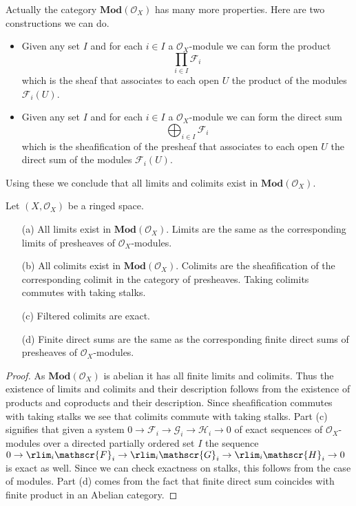 Actually the category $\mathbf{Mod}(\mathscr{O}_X)$ has many more properties. Here are two constructions we can do.
\begin{itemize}
\item Given any set $I$ and for each $i\in I$ a $\mathscr{O}_X$-module we can form the product
\[\prod_{i\in I}\mathscr{F}_i\]
which is the sheaf that associates to each open $U$ the product of the modules $\mathscr{F}_i(U)$.
\item Given any set $I$ and for each $i\in I$ a $\mathscr{O}_X$-module we can form the direct sum
\[\bigoplus_{i\in I}\mathscr{F}_i\]
which is the sheafification of the presheaf that associates to each open $U$ the direct sum of the modules $\mathscr{F}_i(U)$.
\end{itemize}
Using these we conclude that all limits and colimits exist in $\mathbf{Mod}(\mathscr{O}_X)$.
\begin{proposition}\label{sheaf module limit}
Let $(X,\mathscr{O}_X)$ be a ringed space.
\begin{itemize}
\item[(a)] All limits exist in $\mathbf{Mod}(\mathscr{O}_X)$. Limits are the same as the corresponding limits of presheaves of $\mathscr{O}_X$-modules.
\item[(b)] All colimits exist in $\mathbf{Mod}(\mathscr{O}_X)$. Colimits are the sheafification of the corresponding colimit in the category of presheaves. Taking colimits commutes with taking stalks.
\item[(c)] Filtered colimits are exact.
\item[(d)] Finite direct sums are the same as the corresponding finite direct sums of presheaves of $\mathscr{O}_X$-modules.
\end{itemize}
\end{proposition}
\begin{proof}
As $\mathbf{Mod}(\mathscr{O}_X)$ is abelian it has all finite limits and colimits. Thus the existence of limits and colimits and their description follows from the existence of products and coproducts and their description. Since sheafification commutes with taking stalks we see that colimits commute with taking stalks. Part (c) signifies that given a system $0\to\mathscr{F}_i\to\mathscr{G}_i\to\mathscr{H}_i\to 0$ of exact sequences of $\mathscr{O}_X$-modules over a directed partially ordered set $I$ the sequence $0\to\rlim_i\mathscr{F}_i\to\rlim_i\mathscr{G}_i\to\rlim_i\mathscr{H}_i\to 0$ is exact as well. Since we can check exactness on stalks, this follows from the case of modules. Part (d) comes from the fact that finite direct sum coincides with finite product in an Abelian category.
\end{proof}
